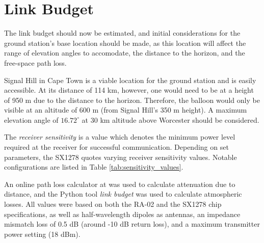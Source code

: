 \section{Link Budget}

The link budget should now be estimated, and initial considerations for the ground station's base location should be made, as this location will affect the range of elevation angles to accomodate, the distance to the horizon, and the free-space path loss.

Signal Hill in Cape Town is a viable location for the ground station and is easily accessible. At its distance of 114 km, however, one would need to be at a height of 950 m due to the distance to the horizon. Therefore, the balloon would only be visible at an altitude of 600 m (from Signal Hill's 350 m height). A maximum elevation angle of $16.72^\circ$ at 30 km altitude above Worcester should be considered.

The \textit{receiver sensitivity} is a value which denotes the minimum power level required at the receiver for successful communication. Depending on set parameters, the SX1278 quotes varying receiver sensitivity values. Notable configurations are listed in Table \ref{tab:sensitivity_values}.

An online path loss calculator at \cite{site-pathLossCalculator} was used to calculate attenuation due to distance, and the Python tool \textit{link budget} was used to calculate atmospheric losses. All values were based on both the RA-02 and the SX1278 chip specifications, as well as half-wavelength dipoles as antennas, an impedance mismatch loss of 0.5 dB (around -10 dB return loss), and a maximum transmitter power setting (18 dBm).

